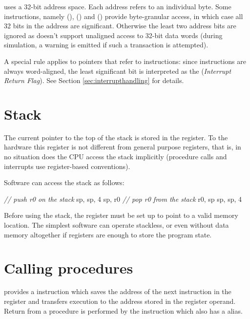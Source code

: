 \documentclass[a4paper,12pt,twoside,extrafontsizes]{memoir}
\begin{document}
\lxp{} uses a 32-bit address space. Each address refers to an individual byte. Some instructions, namely  (),  () and  () provide  byte-granular access, in which case all 32 bits in the address are significant. Otherwise the least two address bits are ignored as \lxp{} doesn't support unaligned access to 32-bit data words (during simulation, a warning is emitted if such a transaction is attempted).

A special rule applies to pointers that refer to instructions: since instructions are always word-aligned, the least significant bit is interpreted as the  (\emph{Interrupt Return Flag}). See Section \ref{sec:interrupthandling} for details.

\section{Stack}
\label{sec:stack}

The current pointer to the top of the stack is stored in the  register. To the hardware this register is not different from general purpose registers, that is, in no situation does the CPU access the stack implicitly (procedure calls and interrupts use register-based conventions).

Software can access the stack as follows:

\begin{codepar}
    \emph{// push r0 on the stack}
     sp, sp, 4
     sp, r0
    \emph{// pop r0 from the stack}
     r0, sp
     sp, sp, 4
\end{codepar}

Before using the stack, the  register must be set up to point to a valid memory location. The simplest software can operate stackless, or even without data memory altogether if registers are enough to store the program state.

\section{Calling procedures}
\label{sec:callingprocedures}

\lxp{} provides a  instruction which saves the address of the next instruction in the  register and transfers execution to the address stored in the register operand. Return from a procedure is performed by the  instruction which also has a  alias.
\end{document}
